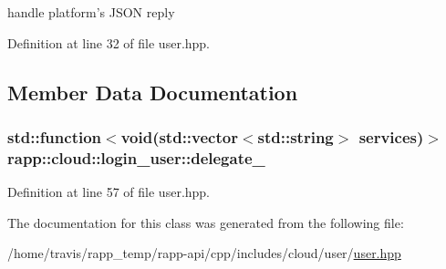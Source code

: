 handle platform's J\-S\-O\-N reply 



Definition at line 32 of file user.\-hpp.



\subsection{Member Data Documentation}
\hypertarget{classrapp_1_1cloud_1_1login__user_ab36ba8bfaf26a1960ab874ce38cc94b0}{
\subsubsection[{delegate\-\_\-}]{\setlength{\rightskip}{0pt plus 5cm}std\-::function$<$void(std\-::vector$<$std\-::string$>$ services)$>$ rapp\-::cloud\-::login\-\_\-user\-::delegate\-\_\-\hspace{0.3cm}{\ttfamily [private]}}}\label{classrapp_1_1cloud_1_1login__user_ab36ba8bfaf26a1960ab874ce38cc94b0}


Definition at line 57 of file user.\-hpp.



The documentation for this class was generated from the following file\-:\begin{DoxyCompactItemize}
\item 
/home/travis/rapp\-\_\-temp/rapp-\/api/cpp/includes/cloud/user/\hyperlink{user_8hpp}{user.\-hpp}\end{DoxyCompactItemize}
